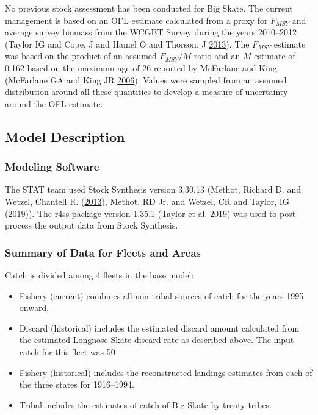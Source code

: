 \documentclass[12pt,]{article}
\begin{document}
No previous stock assessment has been conducted for Big Skate. The
current management is based on an OFL estimate calculated from a proxy
for \(F_{MSY}\) and average survey biomass from the WCGBT Survey during
the years 2010--2012 (Taylor IG and Cope, J and Hamel O and Thorson, J
\protect\hyperlink{ref-Taylor2013}{2013}). The \(F_{MSY}\) estimate was
based on the product of an assumed \(F_{MSY}/M\) ratio and an \(M\)
estimate of 0.162 based on the maximum age of 26 reported by McFarlane
and King (McFarlane GA and King JR
\protect\hyperlink{ref-McFandKing2006}{2006}). Values were sampled from
an assumed distribution around all these quantities to develop a measure
of uncertainty around the OFL estimate.

\hypertarget{model-description}{%
\subsection{Model Description}\label{model-description}}

\hypertarget{modeling-software}{%
\subsubsection{Modeling Software}\label{modeling-software}}

The STAT team used Stock Synthesis version 3.30.13 (Methot, Richard D.
and Wetzel, Chantell R. (\protect\hyperlink{ref-Methot2013}{2013}),
Methot, RD Jr. and Wetzel, CR and Taylor, IG
(\protect\hyperlink{ref-Methot2019}{2019})). The r4ss package version
1.35.1 (Taylor et al. \protect\hyperlink{ref-Taylor2019}{2019}) was used
to post-process the output data from Stock Synthesis.

\hypertarget{summary-of-data-for-fleets-and-areas}{%
\subsubsection{Summary of Data for Fleets and
Areas}\label{summary-of-data-for-fleets-and-areas}}

Catch is divided among 4 fleets in the base model:

\begin{itemize}
\item Fishery (current) combines all non-tribal sources of catch for the years 1995 onward,
\item Discard (historical) includes the estimated discard amount calculated from the estimated Longnose Skate discard rate as described above. The input catch for this fleet was 50%
\item Fishery (historical) includes the reconstructed landings estimates from each of the three states for 1916--1994.
\item Tribal includes the estimates of catch of Big Skate by treaty tribes.
\end{itemize}
\end{document}
